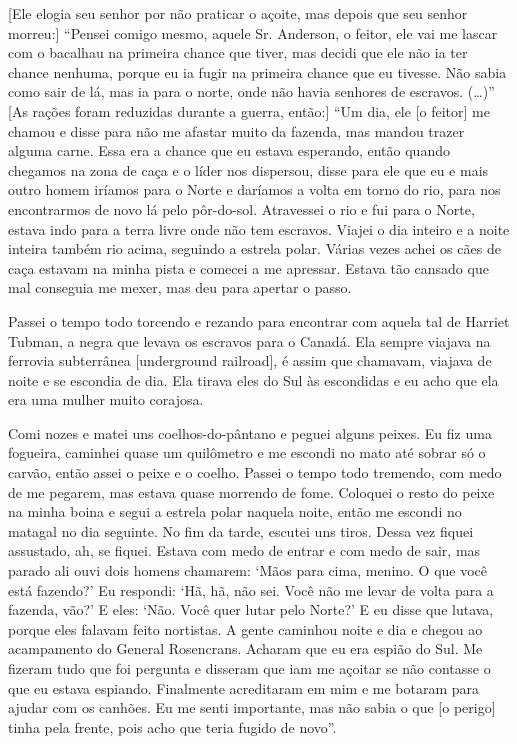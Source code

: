 {[}Ele elogia seu senhor por não praticar o açoite, mas depois que seu
senhor morreu:{]} ``Pensei comigo mesmo, aquele Sr. Anderson, o feitor,
ele vai me lascar com o bacalhau na primeira chance que tiver, mas
decidi que ele não ia ter chance nenhuma, porque eu ia fugir na primeira
chance que eu tivesse. Não sabia como sair de lá, mas ia para o norte,
onde não havia senhores de escravos. (\ldots{})'' {[}As rações foram
reduzidas durante a guerra, então:{]} ``Um dia, ele {[}o feitor{]} me
chamou e disse para não me afastar muito da fazenda, mas mandou trazer
alguma carne. Essa era a chance que eu estava esperando, então quando
chegamos na zona de caça e o líder nos dispersou, disse para ele que eu
e mais outro homem iríamos para o Norte e daríamos a volta em torno do
rio, para nos encontrarmos de novo lá pelo pôr-do-sol. Atravessei o rio
e fui para o Norte, estava indo para a terra livre onde não tem
escravos. Viajei o dia inteiro e a noite inteira também rio acima,
seguindo a estrela polar. Várias vezes achei os cães de caça estavam na
minha pista e comecei a me apressar. Estava tão cansado que mal
conseguia me mexer, mas deu para apertar o passo.

Passei o tempo todo torcendo e rezando para encontrar com aquela tal de
Harriet Tubman, a negra que levava os escravos para o Canadá. Ela sempre
viajava na ferrovia subterrânea {[}underground railroad{]}, é assim que
chamavam, viajava de noite e se escondia de dia. Ela tirava eles do Sul
às escondidas e eu acho que ela era uma mulher muito corajosa.

Comi nozes e matei uns coelhos-do-pântano e peguei alguns peixes. Eu fiz
uma fogueira, caminhei quase um quilômetro e me escondi no mato até
sobrar só o carvão, então assei o peixe e o coelho. Passei o tempo todo
tremendo, com medo de me pegarem, mas estava quase morrendo de fome.
Coloquei o resto do peixe na minha boina e segui a estrela polar naquela
noite, então me escondi no matagal no dia seguinte. No fim da tarde,
escutei uns tiros. Dessa vez fiquei assustado, ah, se fiquei. Estava com
medo de entrar e com medo de sair, mas parado ali ouvi dois homens
chamarem: `Mãos para cima, menino. O que você está fazendo?' Eu
respondi: `Hã, hã, não sei. Você não me levar de volta para a fazenda,
vão?' E eles: `Não. Você quer lutar pelo Norte?' E eu disse que lutava,
porque eles falavam feito nortistas. A gente caminhou noite e dia e
chegou ao acampamento do General Rosencrans. Acharam que eu era espião
do Sul. Me fizeram tudo que foi pergunta e disseram que iam me açoitar
se não contasse o que eu estava espiando. Finalmente acreditaram em mim
e me botaram para ajudar com os canhões. Eu me senti importante, mas não
sabia o que {[}o perigo{]} tinha pela frente, pois acho que teria fugido
de novo''.

